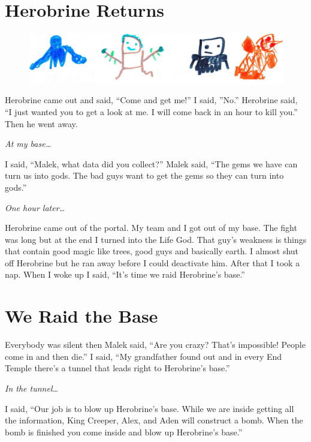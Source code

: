 \documentclass[12pt,oneside]{krantz}
\begin{document}
\chapter{Herobrine Returns}\label{herobrine-returns}

\begin{figure}
\centering
\includegraphics[width=6.25000in]{img/3-gods.jpg}
\caption{}
\end{figure}

Herobrine came out and said, ``Come and get me!'' I said, ''No.''
Herobrine said, ``I just wanted you to get a look at me. I will come
back in an hour to kill you.'' Then he went away.

\emph{At my base\ldots{}}

I said, ``Malek, what data did you collect?'' Malek said, ``The gems we
have can turn us into gods. The bad guys want to get the gems so they
can turn into gods.''

\emph{One hour later\ldots{}}

Herobrine came out of the portal. My team and I got out of my base. The
fight was long but at the end I turned into the Life God. That guy's
weakness is things that contain good magic like trees, good guys and
basically earth. I almost shut off Herobrine but he ran away before I
could deactivate him. After that I took a nap. When I woke up I said,
``It's time we raid Herobrine's base.''

\chapter{We Raid the Base}\label{we-raid-the-base}

Everybody was silent then Malek said, ``Are you crazy? That's
impossible! People come in and then die.'' I said, ``My grandfather
found out and in every End Temple there's a tunnel that leads right to
Herobrine's base.''

\emph{In the tunnel\ldots{}}

I said, ``Our job is to blow up Herobrine's base. While we are inside
getting all the information, King Creeper, Alex, and Aden will construct
a bomb. When the bomb is finished you come inside and blow up
Herobrine's base.''
\end{document}
